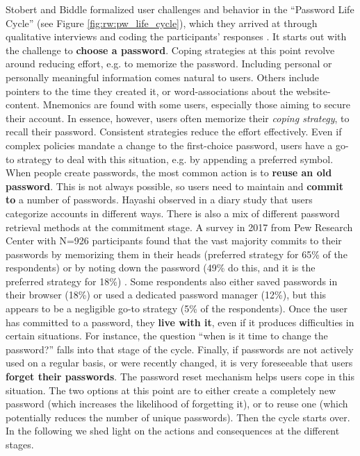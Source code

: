 Stobert and Biddle formalized user challenges and behavior in the ``Password Life Cycle'' (see Figure \ref{fig:rw:pw_life_cycle}), which they arrived at through qualitative interviews and coding the participants' responses \cite{Stobert2014PasswordLifeCycle}. 
It starts out with the challenge to \textbf{choose a password}. Coping strategies at this point revolve around reducing effort, e.g. to memorize the password. Including personal or personally meaningful information comes natural to users. Others include pointers to the time they created it, or word-associations about the website-content. Mnemonics are found with some users, especially those aiming to secure their account. In essence, however, users often memorize their \textit{coping strategy}, to recall their password. Consistent strategies reduce the effort effectively. Even if complex policies mandate a change to the first-choice password, users have a go-to strategy to deal with this situation, e.g. by appending a preferred symbol. 
When people create passwords, the most common action is to \textbf{reuse an old password}. 
This is not always possible, so users need to maintain and \textbf{commit to} a number of passwords. Hayashi \etal observed in a diary study that users categorize accounts \cite{Hayashi2011DiaryStudyPWs} in different ways. There is also a mix of different password retrieval methods at the commitment stage. A survey in 2017 from Pew Research Center with N=926 participants found that the vast majority commits to their passwords by memorizing them in their heads (preferred strategy for 65\% of the respondents) or by noting down the password (49\% do this, and it is the preferred strategy for 18\%) \cite{Olmstead2017AmerciansCybersecurity}. Some respondents also either saved passwords in their browser (18\%) or used a dedicated password manager (12\%), but this appears to be a negligible go-to strategy (5\% of the respondents). 
Once the user has committed to a password, they \textbf{live with it}, even if it produces difficulties in certain situations. For instance, the question ``when is it time to change the password?'' falls into that stage of the cycle. 
Finally, if passwords are not actively used on a regular basis, or were recently changed, it is very foreseeable that users \textbf{forget their passwords}. The password reset mechanism helps users cope in this situation. The two options at this point are to either create a completely new password (which increases the likelihood of forgetting it), or to reuse one (which potentially reduces the number of unique passwords). Then the cycle starts over. In the following we shed light on the actions and consequences at the different stages. 

